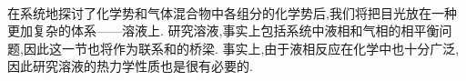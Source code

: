\documentclass{ctexart}
\begin{document}
\pagestyle{plain}
\noindent{}\vspace{15pt}\\
\indent 在系统地探讨了化学势和气体混合物中各组分的化学势后,我们将把目光放在一种更加复杂的体系——溶液上.%
研究溶液,事实上包括系统中液相和气相的相平衡问题,因此这一节也将作为联系和的桥梁.%
事实上,由于液相反应在化学中也十分广泛,因此研究溶液的热力学性质也是很有必要的.\vspace{12pt}\\
\end{document}
